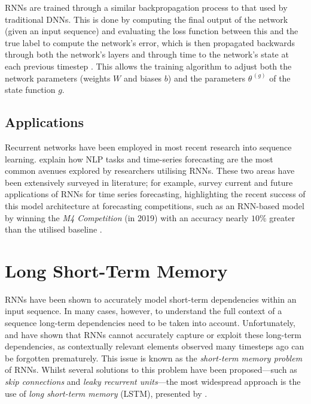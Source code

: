 \documentclass[a4paper, 11pt]{report}
\begin{document}
    RNNs are trained through a similar backpropagation process to that used by traditional DNNs. This is done by computing the final output of the network (given an input sequence) and evaluating the loss function between this and the true label to compute the network's error, which is then propagated backwards through both the network's layers and through time to the network's state at each previous timestep \citep{zhang-2021}. This allows the training algorithm to adjust both the network parameters (weights $W$ and biases $b$) and the parameters $\theta^{\,(g)}$ of the state function $g$.


    \subsection{Applications}

    Recurrent networks have been employed in most recent research into sequence learning. \citet{lipton-2015} explain how NLP tasks and time-series forecasting are the most common avenues explored by researchers utilising RNNs. These two areas have been extensively surveyed in literature; for example, \citet{hewamalage-2021} survey current and future applications of RNNs for time series forecasting, highlighting the recent success of this model architecture at forecasting competitions, such as an RNN-based model by \citet{smyl-2020} winning the \emph{M4 Competition} (in 2019) with an accuracy nearly $10\%$ greater than the utilised baseline \citep{makridakis-2020}.


    \section{Long Short-Term Memory}

    RNNs have been shown to accurately model short-term dependencies within an input sequence. In many cases, however, to understand the full context of a sequence long-term dependencies need to be taken into account. Unfortunately, \citet{hochreiter-1991} and \citet{bengio-1994} have shown that RNNs cannot accurately capture or exploit these long-term dependencies, as contextually relevant elements observed many timesteps ago can be forgotten prematurely. This issue is known as the \emph{short-term memory problem} of RNNs. Whilst several solutions to this problem have been proposed---such as \emph{skip connections} and \emph{leaky recurrent units}---the most widespread approach is the use of \emph{long short-term memory} (LSTM), presented by \citet{hochreiter-1997}.
\end{document}

